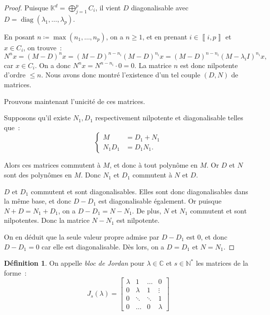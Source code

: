 \documentclass{report}
\theoremstyle{definition}
\newtheorem{déf}[thm]{Définition}
\theoremstyle{remark}
\numberwithin{equation}{section}
\newcommand{\K}{\mathbb K}
\newcommand{\C}{\mathbb C}
\newcommand{\N}{\mathbb N}
\newcommand{\Ns}{\N^{*}}
\DeclareMathOperator{\diag}{diag}
\newcommand{\intint}[2]{\left\llbracket#1, #2\right\rrbracket}
\begin{document}
\begin{proof}
			Puisque $\K^d = \bigoplus_{j = 1}^pC_i$, il vient $D$ diagonalisable avec $D = \diag(\lambda_1, \ldots, \lambda_p)$.

			En posant $n \coloneqq \max\left(n_1, \ldots, n_p\right)$, on a $n \geq 1$, et en prenant $i \in \intint ip$ et $x \in C_i$, on trouve~:
			\begin{equation}
				N^nx = (M-D)^nx = (M-D)^{n-n_i}(M-D)^{n_i}x = (M-D)^{n-n_i}\left(M-\lambda_iI\right)^{n_i}x,
			\end{equation}
			car $x \in C_i$. On a donc $N^nx = N^{n-n_i} \cdot 0 = 0$. La matrice $n$ est donc nilpotente d'ordre $\leq n$. Nous avons donc montré l'existence
			d'un tel couple $(D, N)$ de matrices.

			Prouvons maintenant l'unicité de ces matrices.

			Supposons qu'il existe $N_1, D_1$ respectivement nilpotente et diagonalisable telles que~:
			\begin{equation}
				\begin{cases}
				M &= D_1+N_1 \\
				N_1D_1 &= D_1N_1.
			\end{cases}
			\end{equation}

			Alors ces matrices commutent à $M$, et donc à tout polynôme en $M$. Or $D$ et $N$ sont des polynômes en $M$. Donc $N_1$ et $D_1$ commutent à $N$ et $D$.

			$D$ et $D_1$ commutent et sont diagonalisables. Elles sont donc diagonalisables dans la même base, et donc $D-D_1$ est diagonalisable également.
			Or puisque $N+D = N_1+D_1$, on a $D-D_1 = N-N_1$. De plus, $N$ et $N_1$ commutent et sont nilpotentes. Donc la matrice $N-N_1$ est nilpotente.

			On en déduit que la seule valeur propre admise par $D-D_1$ est 0, et donc $D-D_1 = 0$ car elle est diagonalisable. Dès lors, on a $D=D_1$ et $N=N_1$.
			\end{proof}

			\begin{déf} On appelle \textit{bloc de Jordan} pour $\lambda \in \C$ et $s \in \Ns$ les matrices de la forme~:
			\begin{equation}
				J_s(\lambda) =
				\begin{bmatrix}
						\lambda & 1 & \ldots & 0 \\
					0 & \lambda & 1 & \vdots \\
					0 & \ddots & \ddots & 1 \\
					0 & \ldots & 0 & \lambda
				\end{bmatrix}
			\end{equation}
			\end{déf}
\end{document}
